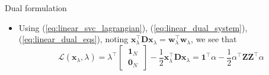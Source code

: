 \documentclass{beamer}
\numberwithin{equation}{section}
\newcommand{\aref}[1]{\alert{\ref{#1}}}
\begin{document}
\begin{frame}{Dual formulation}
\begin{itemize}
        \item
        Using (\aref{eq:linear_svc_lagrangian}),
        (\aref{eq:linear_dual_system}), (\aref{eq:linear_dual_eqs}), noting
        $ \mathbf{x}_\lambda^\top\mathbf{Dx}_\lambda =
        \mathbf{w}_\lambda^\top\mathbf{w}_\lambda $, we see that
        \begin{equation} \label{eq:linear_svc_dual_func}
            \mathcal{L}(\mathbf{x}_\lambda, \lambda) = \lambda^\top
            \begin{bmatrix}
                \ \mathbf{1}_N \ \\ \ \mathbf{0}_N \
            \end{bmatrix} -
            \frac{1}{2}\mathbf{x}_\lambda^\top\mathbf{Dx}_\lambda =
            \mathbf{1}^\top\alpha -
            \frac{1}{2}\alpha^\top\mathbf{ZZ}^\top\alpha
        \end{equation}
    \end{itemize}
\end{frame}
\end{document}

